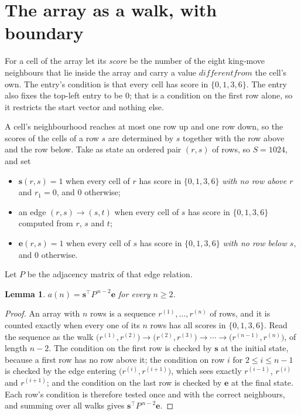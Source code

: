 \documentclass[11pt,a4paper]{article}
\theoremstyle{plain}
\newtheorem{lemma}[theorem]{Lemma}
\theoremstyle{definition}
\begin{document}
\section{The array as a walk, with boundary}

For a cell of the array let its \emph{score} be the number of the eight king-move neighbours that lie inside
the array and carry a value $different from$ the cell's own. The entry's condition is that every cell
has score in $\{0,1,3,6\}$. The entry also fixes the top-left entry to be $0$; that is a condition on the first row alone, so it restricts the start vector and nothing else.

A cell's neighbourhood reaches at most one row up and one row down, so the scores of the
cells of a row $s$ are determined by $s$ together with the row above and the row below.
Take as state an ordered pair $(r,s)$ of rows, so $S=1024$, and set
\begin{itemize}
\item $\mathbf{s}(r,s)=1$ when every cell of $r$ has score in $\{0,1,3,6\}$ \emph{with no row
above $r$} and $r_1=0$, and $0$ otherwise;
\item an edge $(r,s)\to(s,t)$ when every cell of $s$ has score in $\{0,1,3,6\}$ computed from
$r$, $s$ and $t$;
\item $\mathbf{e}(r,s)=1$ when every cell of $s$ has score in $\{0,1,3,6\}$ \emph{with no row
below $s$}, and $0$ otherwise.
\end{itemize}
Let $P$ be the adjacency matrix of that edge relation.

\begin{lemma}\label{lem:walk}
$a(n)=\mathbf{s}^{\!\top}P^{\,n-2}\mathbf{e}$ for every $n\ge2$.
\end{lemma}

\begin{proof}
An array with $n$ rows is a sequence $r^{(1)},\dots,r^{(n)}$ of rows, and it is counted
exactly when every one of its $n$ rows has all scores in $\{0,1,3,6\}$. Read the sequence as the
walk $\bigl(r^{(1)},r^{(2)}\bigr)\to\bigl(r^{(2)},r^{(3)}\bigr)\to\cdots\to
\bigl(r^{(n-1)},r^{(n)}\bigr)$, of length $n-2$. The condition on the first row is
checked by $\mathbf{s}$ at the initial state, because a first row has no row above it; the
condition on row $i$ for $2\le i\le n-1$ is checked by the edge entering
$\bigl(r^{(i)},r^{(i+1)}\bigr)$, which sees exactly $r^{(i-1)}$, $r^{(i)}$ and
$r^{(i+1)}$; and the condition on the last row is checked by $\mathbf{e}$ at the final
state. Each row's condition is therefore tested once and with the correct neighbours, and
summing over all walks gives $\mathbf{s}^{\!\top}P^{\,n-2}\mathbf{e}$.
\end{proof}
\end{document}
